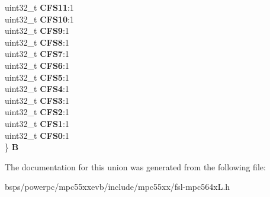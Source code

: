 \begin{DoxyCompactItemize}
\begin{tabbing}
\>uint32\_t {\bfseries CFS11}:1\\
\>uint32\_t {\bfseries CFS10}:1\\
\>uint32\_t {\bfseries CFS9}:1\\
\>uint32\_t {\bfseries CFS8}:1\\
\>uint32\_t {\bfseries CFS7}:1\\
\>uint32\_t {\bfseries CFS6}:1\\
\>uint32\_t {\bfseries CFS5}:1\\
\>uint32\_t {\bfseries CFS4}:1\\
\>uint32\_t {\bfseries CFS3}:1\\
\>uint32\_t {\bfseries CFS2}:1\\
\>uint32\_t {\bfseries CFS1}:1\\
\>uint32\_t {\bfseries CFS0}:1\\
\} {\bfseries B}\\

\end{tabbing}\end{DoxyCompactItemize}


The documentation for this union was generated from the following file\+:\begin{DoxyCompactItemize}
\item 
bsps/powerpc/mpc55xxevb/include/mpc55xx/fsl-\/mpc564x\+L.\+h\end{DoxyCompactItemize}
